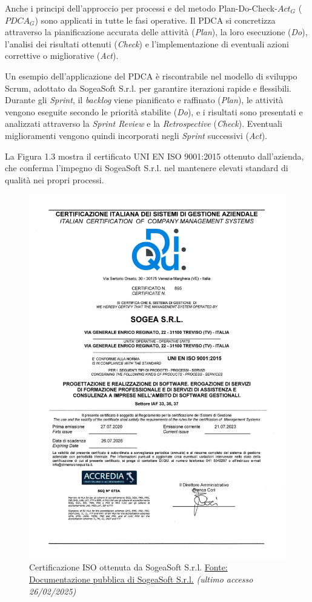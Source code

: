     \vspace{0.2 em}
    \noindent Anche i principi dell’approccio per processi e del metodo Plan-Do-Check-$Act_G$ ($PDCA_G$) sono applicati in tutte le fasi operative. Il PDCA si concretizza attraverso la pianificazione accurata delle attività (\textit{Plan}), la loro esecuzione (\textit{Do}), l’analisi dei risultati ottenuti (\textit{Check}) e l’implementazione di eventuali azioni correttive o migliorative (\textit{Act}).

    \vspace{0.2 em}
    \noindent Un esempio dell’applicazione del PDCA è riscontrabile nel modello di sviluppo Scrum, adottato da SogeaSoft S.r.l. per garantire iterazioni rapide e flessibili. Durante gli \textit{Sprint}, il \textit{backlog} viene pianificato e raffinato (\textit{Plan}), le attività vengono eseguite secondo le priorità stabilite (\textit{Do}), e i risultati sono presentati e analizzati attraverso la \textit{Sprint Review} e la \textit{Retrospective} (\textit{Check}). Eventuali miglioramenti vengono quindi incorporati negli \textit{Sprint} successivi (\textit{Act}).

    \vspace{0.2 em}
    \noindent La Figura 1.3 mostra il certificato UNI EN ISO 9001:2015 ottenuto dall’azienda, che conferma l’impegno di SogeaSoft S.r.l. nel mantenere elevati standard di qualità nei propri processi.

    \begin{figure}[H]
        \centering
        \includegraphics[width=0.5\linewidth]{BCS-Tessi/images/CertificatoSogea.jpg}
        \caption[Certificazione ISO di SogeaSoft S.r.l.]{Certificazione ISO ottenuta da SogeaSoft S.r.l. \href{https://sogeasoft.com/p/iso9001}{Fonte: Documentazione pubblica di SogeaSoft S.r.l.}
        \textit{(ultimo accesso 26/02/2025)}}
        \label{fig:certificazione-iso}
    \end{figure}

